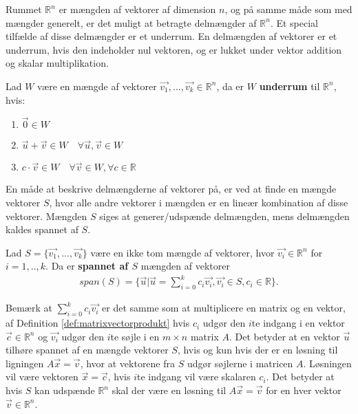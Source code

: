 Rummet $\mathds{R}^n$ er mængden af vektorer af dimension $n$, og på samme måde som med mængder generelt, er det muligt at betragte delmængder af $\mathds{R}^n$.
Et special tilfælde af disse delmængder er et underrum.
En delmængden af vektorer  er et underrum, hvis den indeholder nul vektoren, og er lukket under vektor addition og skalar multiplikation. 
\begin{defn}[Underrum]
Lad $W$ være en mængde af vektorer $\vec{v_1},...,\vec{v_k} \in \mathds{R}^n$, da er $W$  \textbf{underrum} til $\mathds{R}^n$, hvis:
\begin{enumerate}[label=\alph*]
\item $\vec{0} \in W$
\item $\vec{u}+\vec{v} \in W \quad \forall \vec{u}, \vec{v} \in W$
\item $c \cdot \vec{v} \in W \quad \forall \vec{v} \in W, \forall c \in \mathds{R}$
\end{enumerate}
\label{def:underrum}
\end{defn}
En måde at beskrive delmængderne af vektorer på, er ved at finde en mængde vektorer $S$, hvor alle andre vektorer i mængden er en lineær kombination af disse vektorer. 
Mængden $S$ siges at generer/udspænde delmængden, mens delmængden kaldes spannet af $S$.
\begin{defn}[Span]
Lad $S=\{\vec{v_1},...,\vec{v_k}\}$ være en ikke tom mængde af vektorer, hvor $\vec{v_i} \in \mathds{R}^n$ for $i = 1,..,k$. 
Da er \textbf{spannet af $S$} mængden af vektorer
\begin{align*}
span(S) = \{\vec{u}| \vec{u}=\sum_{i=0}^k c_i \vec{v_i}, \vec{v_i} \in S, c_i \in \mathds{R}\}.
\end{align*} 
\label{def:span}
\end{defn}
Bemærk at $\sum_{i=0}^k c_i \vec{v_i}$ er det samme som at multiplicere en matrix og en vektor, af Definition \ref{def:matrixvectorprodukt} hvis $c_i$ udgør den $i$te indgang i en vektor $\vec{c} \in \mathds{R}^n$ og $\vec{v_i}$ udgør den $i$te søjle i en $m \times n$ matrix $A$.
Det betyder at en vektor $\vec{u}$ tilhøre spannet af en mængde vektorer $S$, hvis og kun hvis der er en løsning til ligningen $A\vec{x} = \vec{v}$, hvor at vektorene fra $S$ udgør søjlerne i matricen $A$.
Løsningen vil være vektoren $\vec{x}=\vec{c}$, hvis $i$te indgang vil være skalaren $c_i$.
Det betyder at hvis $S$ kan udspænde $\mathds{R}^n$ skal der være en løsning til $A \vec{x} = \vec{v}$ for en hver vektor $\vec{v} \in \mathds{R}^n$. 
